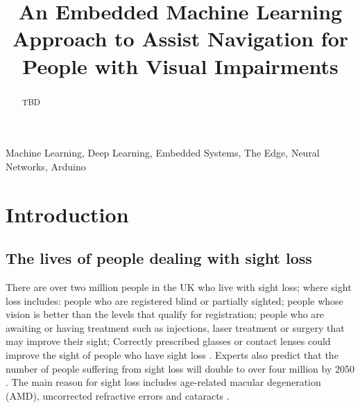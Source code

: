 \documentclass[conference]{IEEEtran}
\begin{document}
\title{An Embedded Machine Learning Approach to Assist Navigation for People with Visual Impairments\\}

\author{
}

\maketitle
\thispagestyle{plain}
\pagestyle{plain}

\begin{abstract}
TBD
\end{abstract}

\begin{IEEEkeywords}
Machine Learning, Deep Learning, Embedded Systems, The Edge, Neural Networks, Arduino
\end{IEEEkeywords}

\section{Introduction}
\subsection{The lives of people dealing with sight loss}
There are over two million people in the UK who live with sight loss; where sight loss includes: people who are registered blind or partially sighted; people whose vision is better than the levels that qualify for registration; people who are awaiting or having treatment such as injections, laser treatment or surgery that may improve their sight; Correctly prescribed glasses or contact lenses could improve the sight of people who have sight loss \cite{b1}. Experts also predict that the number of people suffering from sight loss will double to over four million by 2050 \cite{b2}. The main reason for sight loss includes age-related macular degeneration (AMD), uncorrected refractive errors and cataracts \cite{b1}. 
\end{document}
